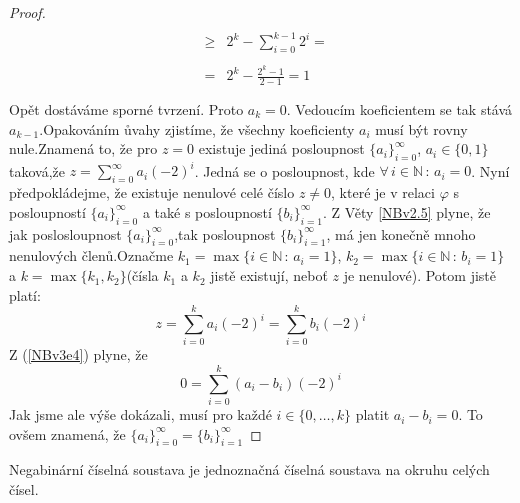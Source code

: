 \documentclass[czech,bachelor,dept470,male]{diploma}
\newcommand{\posla}{\{a_i\}_{i=0}^{\infty}}
\newcommand{\poslb}{\{b_i\}_{i=1}^{\infty}}
\begin{document}
\begin{proof}
\begin{equation}
\begin{array}{rcl}
			                            &      &                                                   \\
			                            & \geq & 2^{k} - \sum_{i=0}^{k-1}2^i =                     \\
			                            &      &                                                   \\
			                            & =    & \displaystyle{ 2^{k} - \frac{2^{k} - 1}{2-1} = 1} \\
			                            &      &                                                   \\
		\end{array}
	\end{equation}
	Opět dostáváme sporné tvrzení. Proto $a_k = 0$. Vedoucím koeficientem se tak stává $a_{k-1}$.\newline Opakováním ůvahy zjistíme, že všechny koeficienty $a_i$ musí být rovny nule.\newline Znamená to, že pro $z = 0$ existuje jediná posloupnost $\{a_i\}_{i=0}^\infty$, $a_i \in\{0,1\}$ taková,\newline že $z = \sum_{i=0}^{\infty}a_i(-2)^i$. Jedná se o posloupnost, kde $\forall\,i\in \mathbb{N}\, :\, a_i = 0$.\newline
	Nyní předpokládejme, že existuje nenulové celé číslo $z \neq 0$, které je v relaci $\varphi$ s posloupností $\posla$ a také s posloupností $\poslb$.
	Z Věty \ref{NBv2.5} plyne, že jak poslosloupnost $\posla$,\newline tak posloupnost $\poslb$, má jen konečně mnoho nenulových členů.\newline Označme $k_1 = \max\{i \in \mathbb{N}\,:\, a_i = 1\}$, $k_2 = \max\{i \in \mathbb{N}\,:\, b_i = 1\}$ a $k = \max\{k_1, k_2\}$\newline (čísla $k_1$ a $k_2$ jistě existují, neboť $z$ je nenulové). Potom jistě platí:
	\begin{equation}\label{NBv3e4}
		z=\sum_{i=0}^{k}a_i(-2)^i = \sum_{i=0}^{k}b_i(-2)^i
	\end{equation}
	Z (\ref{NBv3e4}) plyne, že
	\begin{equation}
		0 = \sum_{i=0}^{k}(a_i - b_i)(-2)^i
	\end{equation}
	Jak jsme ale výše dokázali, musí pro každé $i \in \{0, \dots, k\}$ platit $a_i - b_i = 0$. To ovšem znamená, že $\posla = \poslb$
\end{proof}
\begin{consequence}
	Negabinární číselná soustava je jednoznačná číselná soustava na okruhu celých čísel.
\end{consequence}
\end{document}
